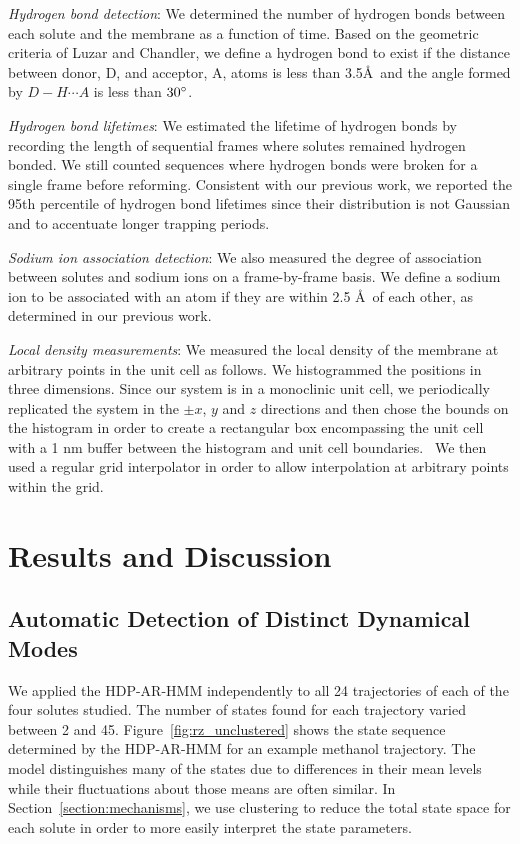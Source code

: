 \documentclass[journal=jpcbfk,manuscript=article]{achemso}
\begin{document}
  \textit{Hydrogen bond detection}: We determined the number of hydrogen bonds 
  between each solute and the membrane as a function of time. Based on the 
  geometric criteria of Luzar and Chandler, we define a hydrogen bond to exist 
  if the distance between donor, D, and acceptor, A, atoms is less than 
  3.5\AA~and the angle formed by $D-H \cdots A$ is less than $30\degree$.~\cite{luzar_effect_1996}
  
  \textit{Hydrogen bond lifetimes}: We estimated the lifetime of hydrogen bonds by 
  recording the length of sequential frames where solutes remained hydrogen bonded.
  We still counted sequences where hydrogen bonds were broken for a single frame 
  before reforming. Consistent with our previous work, we reported the 95th 
  percentile of hydrogen bond lifetimes since their distribution is not Gaussian
  and to accentuate longer trapping periods.~\cite{coscia_chemically_2019}
  
  \textit{Sodium ion association detection}: We also measured the degree of association
  between solutes and sodium ions on a frame-by-frame basis. We define a sodium ion to
  be associated with an atom if they are within 2.5 \AA~of each other, as determined 
  in our previous work.~\cite{coscia_chemically_2019}
  
  \textit{Local density measurements}: We measured the local density of the membrane at
  arbitrary points in the unit cell as follows. We histogrammed the positions in three 
  dimensions. Since our system is in a monoclinic unit cell, we periodically replicated
  the system in the $\pm x$, $y$ and $z$ directions and then chose the bounds on the
  histogram in order to create a rectangular box encompassing the unit cell with
  a 1 nm buffer between the histogram and unit cell boundaries.~\cite{van_der_walt_numpy_2011}
  We then used a regular grid interpolator in order to allow interpolation at arbitrary
  points within the grid.~\cite{virtanen_scipy_2020} 

  \section{Results and Discussion}
  
  \subsection{Automatic Detection of Distinct Dynamical Modes}\label{section:find_modes}
  
  We applied the HDP-AR-HMM independently to all 24 trajectories of each of the four solutes studied.
  The number of states found for each trajectory varied between 2 and 45.  %
  Figure~\ref{fig:rz_unclustered} shows the state sequence determined by the HDP-AR-HMM for
  an example methanol trajectory. The model distinguishes many of the states due to 
  differences in their mean levels while their fluctuations about those means are often 
  similar. In Section~\ref{section:mechanisms}, we use clustering to reduce the total state
  space for each solute in order to more easily interpret the state parameters.
  
\end{document}
